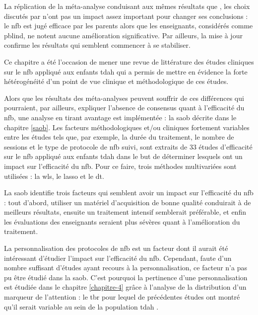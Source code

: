 La réplication de la méta-analyse conduisant aux mêmes résultats que \citet{Cortese2016}, les choix discutés par \citet{Micoulaud2016} n'ont pas un impact assez
important pour changer ses conclusions : le \gls{nfb} est jugé efficace par les parents alors que les enseignants, considérés comme \gls{pblind}, ne notent aucune
amélioration significative. Par ailleurs, la mise à jour confirme les résultats qui semblent commencer à se stabiliser.

Ce chapitre a été l'occasion de mener une revue de littérature des études cliniques sur le \gls{nfb} appliqué aux enfants \gls{tdah} 
qui a permis de mettre en évidence la forte hétérogénéité d'un point de vue clinique et méthodologique de ces études. 

Alors que les résultats des méta-analyses peuvent souffrir de ces différences qui pourraient, par ailleurs, expliquer l'absence de consensus quant 
à l'efficacité du \gls{nfb}, une analyse en tirant avantage est implémentée : la \gls{saob} décrite dans le chapitre \ref{saob}. Les facteurs méthodologiques et/ou 
cliniques fortement variables entre les études tels que, par exemple, la durée du traitement, le nombre de sessions et le type de protocole de \gls{nfb} 
suivi, sont extraits de 33 études d'efficacité sur le \gls{nfb} appliqué aux enfants \gls{tdah} dans le but de déterminer lesquels ont un impact sur 
l'efficacité du \gls{nfb}. Pour ce faire, trois méthodes multivariées sont utilisées : la \gls{wls}, le \gls{lasso} et le \gls{dt}. 

La \gls{saob} identifie trois facteurs qui semblent avoir un impact sur l'efficacité du \gls{nfb} : tout d'abord, utiliser un matériel d'acquisition de bonne 
qualité conduirait à de meilleurs résultats, ensuite un traitement intensif semblerait préférable, et enfin les évaluations des enseignants seraient plus
sévères quant à l'amélioration du traitement. 

La personnalisation des protocoles de \gls{nfb} est un facteur dont il aurait été intéressant d'étudier l'impact sur l'efficacité du \gls{nfb}.  
Cependant, faute d'un nombre suffisant d'études ayant recours à la personnalisation, ce facteur n'a pas pu être étudié dans la \gls{saob}. C'est pourquoi
la pertinence d'une personnalisation est étudiée dans le chapitre \ref{chapitre-4} grâce à l'analyse de la distribution d'un marqueur de l'attention : le \gls{tbr} pour
lequel de précédentes études ont montré qu'il serait variable au sein de la population \gls{tdah} \citep{Zhang2017, Arns2013, Clarke2001}.

